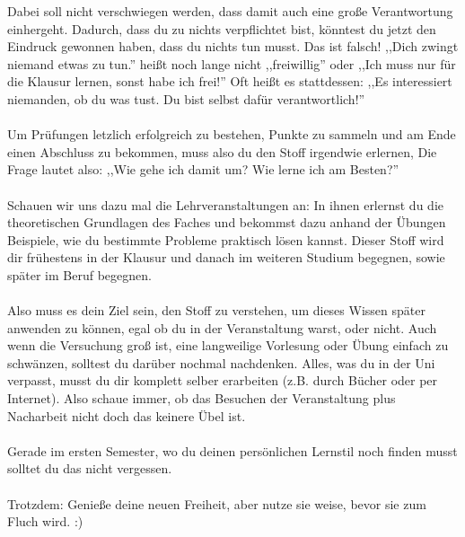 Dabei soll nicht
verschwiegen werden, dass damit auch eine große Verantwortung
einhergeht. Dadurch, dass du zu nichts verpflichtet bist, könntest du
jetzt den Eindruck gewonnen haben, dass du nichts tun musst. Das ist
falsch! ,,Dich zwingt niemand etwas zu tun.'' heißt noch lange 
	nicht ,,freiwillig'' oder ,,Ich muss nur für die Klausur lernen,
	sonst habe ich frei!'' Oft heißt es stattdessen: ,,Es
	interessiert niemanden, ob du was tust. Du bist selbst dafür
	verantwortlich!''\\\\ 
	Um Prüfungen letzlich erfolgreich zu bestehen, Punkte zu sammeln und
	am Ende einen Abschluss zu bekommen, muss also du den Stoff
	irgendwie erlernen, Die  Frage lautet also: ,,Wie gehe ich
	damit um? Wie lerne ich am Besten?''\\\\	
	Schauen wir uns dazu mal die Lehrveranstaltungen an: In ihnen
	erlernst du die theoretischen Grundlagen des Faches und bekommst
	dazu anhand der Übungen Beispiele, wie du bestimmte Probleme
	praktisch lösen kannst.
	 Dieser Stoff 	wird dir frühestens in der Klausur und danach im weiteren
	Studium begegnen, sowie später im Beruf begegnen.  \\\\	
	Also muss es dein Ziel sein, den Stoff zu verstehen, um
	dieses Wissen später anwenden zu können, egal ob du in der
	Veranstaltung warst, oder nicht. Auch wenn die Versuchung groß ist,
	eine langweilige Vorlesung oder Übung einfach zu schwänzen,
	solltest du darüber nochmal nachdenken. Alles, was du in der Uni
	verpasst,  musst du dir komplett selber  erarbeiten
	(z.B. durch Bücher oder per Internet). Also schaue immer, ob das Besuchen 
	der Veranstaltung plus	Nacharbeit nicht doch das keinere Übel ist. \\\\
	Gerade im ersten Semester, wo du deinen persönlichen Lernstil
	noch finden musst solltet du das nicht vergessen.
	\\\\
	Trotzdem: Genieße deine neuen Freiheit, aber nutze sie weise, bevor sie
	zum Fluch wird. :)
\\\\
	
